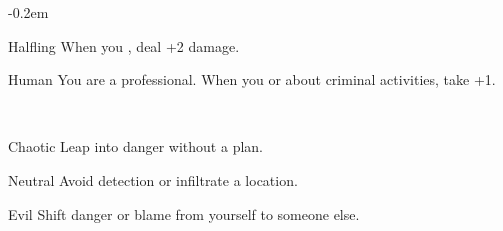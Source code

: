 \documentclass[8pt]{extarticle}
\begin{document}
\openup -0.2em

\charbanner

\begin{minipage}[t]{3.2in}

\begin{optfeature}{Halfling}
  When you , deal +2 damage.
\end{optfeature}

\begin{optfeature}{Human}
  You are a professional. When you  or
   about criminal activities, take +1.
\end{optfeature}

\


\begin{optfeature}{Chaotic}
  Leap into danger without a plan.
\end{optfeature}

\begin{optfeature}{Neutral}
  Avoid detection or infiltrate a location.
\end{optfeature}

\begin{optfeature}{Evil}
  Shift danger or blame from yourself to someone else.
\end{optfeature}

\



\vfill\null
\end{minipage}
\end{document}
